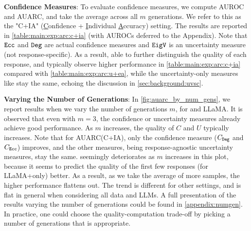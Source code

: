 \textbf{Confidence Measures}: 
To evaluate confidence measures, we compute AUROC and AUARC, and take the average across all $m$ generations. 
We refer to this as the "C+IA" (\underline{C}onfidence + \underline{I}ndividual \underline{A}ccuracy) setting.
The results are reported in \cref{table:main:exp:arc:c+ia} (with AUROCs deferred to the Appendix).
Note that $\texttt{Ecc}$ and $\texttt{Deg}$ are actual confidence measures and $\texttt{EigV}$ is an uncertainty measure (not response-specific).
As a result, able to further distinguish the quality of each response, \methodDegree and \methodEcc typically observe higher performance in \cref{table:main:exp:arc:c+ia} compared with \cref{table:main:exp:arc:u+ea}, while the uncertainty-only measures like \methodEigvClip stay the same, echoing the discussion in \cref{sec:background:uvsc}.



\textbf{Varying the Number of Generations}: 
In \cref{fig:auarc_by_num_gens}, we report results when we vary the number of generations $m$, for \datasettrivia and LLaMA.
It is observed that even with $m=3$, the confidence or uncertainty measures already achieve good performance.
As $m$ increases, the quality of $C$ and $U$ typically increases.
Note that for AUARC(C+IA), only the confidence measure ($C_{\texttt{Deg}}$ and $C_{\texttt{Ecc}}$) improves, and the other measures, being response-agnostic uncertainty measures, stay the same.
\baselineNumSets seemingly deteriorates as $m$ increases in this plot, because it seems to predict the quality of the first few responses (for LLaMA+\datasettrivia only) better.
As a result, as we take the average of more samples, the higher performance flattens out. 
The trend is different for other settings, and is flat in general when considering all data and LLMs.
A full presentation of the results varying the number of generations could be found in \cref{appendix:numgen}.
In practice, one could choose the quality-computation trade-off by picking a number of generations that is appropriate.


